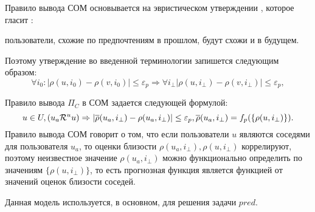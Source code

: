 Правило вывода СОМ основывается
на эвристическом утверждении \cite{cfrs}, которое гласит :
\begin{assert}\label{assertSRS1}
пользователи, схожие по предпочтениям в прошлом, будут схожи и в будущем.
\end{assert}
Поэтому утверждение
во введенной терминологии запишется следующим образом:
\begin{equation*}
	\forall i_0:
	|\rho(u,i_0) - \rho(v,i_0)| \le \varepsilon_p
	\Rightarrow \forall i_{\bot} |\rho(u,i_{\bot}) - \rho(v,i_{\bot})|
	\le \varepsilon_p,
\end{equation*}

Правило вывода $\Pi_C$ в СОМ задается следующей формулой:
\begin{equation}
	\label{srs-pi}
	u \in U, (u_a \mathcal{R}^u u) \Rightarrow |\overline{\rho}(u_a, i_{\bot}) - \rho(u_a, i_{\bot})|
	\le \varepsilon_p, \overline{\rho}(u_a, i_{\bot}) = f_p(\{\rho(u, i_{\bot})\}).
\end{equation}
Правило вывода СОМ говорит о том, что если пользователи $u$ являются
соседями для пользователя $u_a$, то оценки близости $\rho(u_a, i_{\bot}), \rho(u, i_{\bot})$
коррелируют, поэтому
неизвестное значение $\rho(u_a, i_{\bot})$ можно функционально определить по
значениям $\{\rho(u, i_{\bot})\}$, то есть прогнозная функция является функцией от
значений оценок близости соседей.

Данная модель используется, в основном, для решения задачи $pred$.




